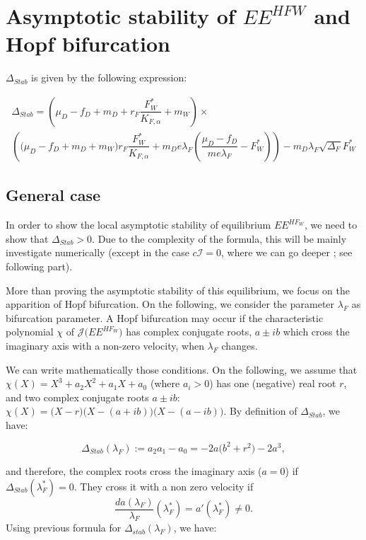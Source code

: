 \documentclass{article}
\newcommand{\lfw}{\lambda_{F}}
\newcommand{\lfw}{\lambda_{F}}
\begin{document}
\section{Asymptotic stability of $EE^{HFW}$ and Hopf bifurcation}

$\Delta_{Stab}$ is given by the following expression:

\begin{multline*}
\Delta_{Stab} = \left(\mu_D -f_D + m_D + r_F \dfrac{F_W^*}{K_{F, \alpha}} + m_W\right) \times \\
\left(\big( \mu_D -f_D + m_D + m_W) r_F \dfrac{F^*_W}{K_{F, \alpha}}   + m_D e\lfw   \left(\dfrac{\mu_D - f_D}{m e\lfw} - F^*_W \right)\right) - m_D \lfw \sqrt{\Delta_F}  F^*_{W} 
\end{multline*}

\subsection{General case}
In order to show the local asymptotic stability of equilibrium $EE^{HF_W}$, we need to show that $\Delta_{Stab} > 0$. Due to the complexity of the formula, this will be mainly investigate numerically (except in the case $c\mathcal{I} = 0$, where we can go deeper ; see following part). 

More than proving the asymptotic stability of this equilibrium, we focus on the apparition of Hopf bifurcation. On the following, we consider the parameter $\lfw$ as bifurcation parameter. A Hopf bifurcation may occur if the characteristic polynomial $\chi$ of $\mathcal{J}\Big(EE^{HF_W}\Big)$  has complex conjugate roots, $a \pm i b$ which cross the imaginary axis with a non-zero velocity, when $\lfw$ changes.
\medskip 

We can write mathematically those conditions. On the following, we assume that $\chi(X) = X^3 + a_2 X^2 + a_1X + a_0$ (where $a_i > 0$) has one (negative) real root $r$, and two complex conjugate roots $a \pm i b$: $\chi(X) = \Big(X - r\Big) \Big(X - (a+ib) \Big)\Big(X - (a-ib) \Big)$. By definition of $\Delta_{Stab}$, we have:

\begin{equation}
\Delta_{Stab}(\lfw) := a_2a_1 - a_0 = -2a\Big(b^2 + r^2) - 2a^3,
\end{equation}

and therefore, the complex roots cross the imaginary axis ($a=0$) if $\Delta_{Stab}(\lfw^*) = 0$. They cross it with a non zero velocity if 
$$
\dfrac{d a(\lfw)}{\lfw} (\lfw^*) = a'(\lfw^*) \neq 0
.$$
Using previous formula for $\Delta_{stab}(\lfw)$, we have:
\end{document}
